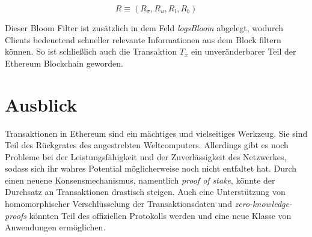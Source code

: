 \documentclass[runningheads]{llncs}
\begin{document}
$$
  R \equiv (R_{\sigma}, R_u, R_l, R_b)
$$

Dieser Bloom Filter ist zusätzlich in dem Feld \textit{logsBloom} abgelegt, wodurch Clients bedeuetend schneller relevante Informationen aus dem Block filtern können. \cite[S. 5]{wood_ethereum_nodate} So ist schließlich auch die Transaktion $ T_x $ ein unveränderbarer Teil der Ethereum Blockchain geworden.

\section{Ausblick}
Transaktionen in Ethereum sind ein mächtiges und vielseitiges Werkzeug. Sie sind Teil des Rückgrates des angestrebten Weltcomputers. Allerdings gibt es noch Probleme bei der Leistungsfähigkeit und der Zuverlässigkeit des Netzwerkes, sodass sich ihr wahres Potential möglicherweise noch nicht entfaltet hat. Durch einen neuene Konsensmechanismus, namentlich \textit{proof of stake}, könnte der Durchsatz an Transaktionen drastisch steigen. Auch eine Unterstützung von homomorphischer Verschlüsselung der Transaktionsdaten und \textit{zero-knowledge-proofs} könnten Teil des offiziellen Protokolls werden und eine neue Klasse von Anwendungen ermöglichen.



\end{document}
